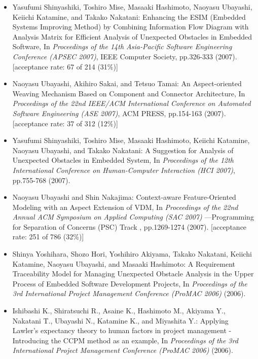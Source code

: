 \documentclass{article}
\begin{document}
\begin{itemize}
\item Yasufumi Shinyashiki, Toshiro Mise, Masaaki Hashimoto, Naoyasu Ubayashi, Keiichi Katamine, and Takako Nakatani:
Enhancing the ESIM (Embedded Systems Improving Method) by Combining Information Flow Diagram with Analysis Matrix for Efficient Analysis of Unexpected Obstacles in Embedded Software,
In {\em Proceedings of the 14th Asia-Pacific Software Engineering Conference (APSEC 2007)},
IEEE Computer Society,
pp.326-333 (2007).
[acceptance rate: 67 of 214 (31\%)]

\item Naoyasu Ubayashi, Akihiro Sakai, and Tetsuo Tamai:
An Aspect-oriented Weaving Mechanism Based on Component and Connector Architecture,
In {\em Proceedings of the 22nd IEEE/ACM International Conference on Automated Software Engineering (ASE 2007)},
ACM PRESS,
pp.154-163 (2007).
[acceptance rate: 37 of 312 (12\%)]

\item Yasufumi Shinyashiki, Toshiro Mise, Masaaki Hashimoto, Keiichi Katamine, Naoyasu Ubayashi, and Takako Nakatani:
A Suggestion for Analysis of Unexpected Obstacles in Embedded System,
In {\em Proceedings of the 12th International Conference on Human-Computer Interaction (HCI 2007)},
pp.755-768 (2007).

\item Naoyasu Ubayashi and Shin Nakajima:
Context-aware Feature-Oriented Modeling with an Aspect Extension of VDM,
In {\em Proceedings of the 22nd Annual ACM Symposium on Applied Computing (SAC 2007)} ---Programming for Separation of Concerns (PSC) Track ,
pp.1269-1274 (2007).
[acceptance rate: 251 of 786 (32\%)]

\item Shinya Yoshihara, Shozo Hori, Yoshihiro Akiyama, Takako Nakatani, Keiichi Katamine, Naoyasu Ubayashi, and Masaaki Hashimoto:
A Requirement Traceability Model for Managing Unexpected Obstacle Analysis in the Upper Process of Embedded Software Development Projects,
In {\em Proceedings of the 3rd International Project Management Conference (ProMAC 2006)} (2006).

\item Ishibashi K., Shiratsuchi R., Asaine K., Hashimoto M., Akiyama Y., Nakatani T., Ubayashi N., Katamine K., and Miyashita Y.:
Applying Lawler's expectancy theory to human factors in project management -Introducing the CCPM method as an example,
In {\em Proceedings of the 3rd International Project Management Conference (ProMAC 2006)} (2006).


\end{itemize}
\end{document}
